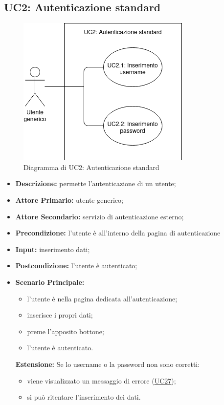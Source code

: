 \subsection{UC2: Autenticazione standard}
\begin{figure}[!ht]
    \caption{Diagramma di UC2: Autenticazione standard}
    \vspace{10px}
    \includegraphics[scale=0.5]{../../../Images/AnalisiRequisiti/UC02}
    \centering
\end{figure}
\label{sec:UC2}
\begin{itemize}
    \item \textbf{Descrizione:} permette l'autenticazione di un utente;
    \item \textbf{Attore Primario:} utente generico;
    \item \textbf{Attore Secondario:} servizio di autenticazione esterno;
    \item \textbf{Precondizione:} l'utente è all'interno della pagina di autenticazione
    \item \textbf{Input:} inserimento dati;
    \item \textbf{Postcondizione:} l'utente è autenticato;
    \item \textbf{Scenario Principale:}
          \begin{itemize}
              \item l'utente è nella pagina dedicata all'autenticazione;
              \item inserisce i propri dati;
              \item preme l'apposito bottone;
              \item l'utente è autenticato.
          \end{itemize}
          \textbf{Estensione:}
          Se lo username o la password non sono corretti:
          \begin{itemize}
              \item viene visualizzato un messaggio di errore (\hyperref[sec:UC27]{\underline{UC27}});
              \item si può ritentare l'inserimento dei dati.
          \end{itemize}
\end{itemize}
